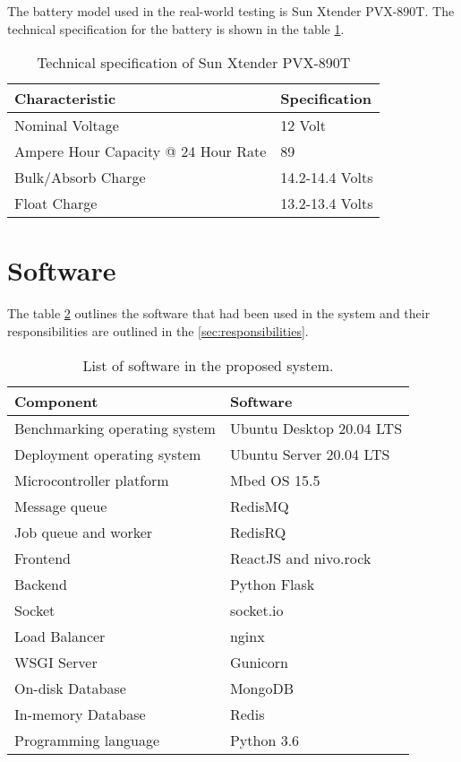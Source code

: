 \documentclass[../thesis.tex]{subfiles}
\begin{document}
The battery model used in the real-world testing is Sun Xtender PVX-890T. The technical specification for the battery is shown in the table \ref{tab:pvx890t}. 

\begin{table}[h!]
	\begin{center}
		\caption{Technical specification of Sun Xtender PVX-890T}
		\label{tab:pvx890t}
		\begin{tabular}{l|l}
			\toprule
			\textbf{Characteristic} & \textbf{Specification}\\
			\midrule
			Nominal Voltage & 12 Volt\\
			Ampere Hour Capacity @ 24 Hour Rate & 89\\
			Bulk/Absorb Charge & 14.2-14.4 Volts\\
			Float Charge & 13.2-13.4 Volts\\
			\bottomrule
		\end{tabular}
	\end{center}
\end{table}

\section{Software}

The table \ref{tab:softwareList} outlines the software that had been used in the system and their responsibilities are outlined in the \autoref{sec:responsibilities}. 

\begin{table}[h!]
	\begin{center}
		\caption{List of software in the proposed system.}
		\label{tab:softwareList}
		\begin{tabular}{l|l}
			\toprule
			\textbf{Component} & \textbf{Software}\\
			\midrule
			Benchmarking operating system & Ubuntu Desktop 20.04 LTS\\
			Deployment operating system & Ubuntu Server 20.04 LTS\\
			Microcontroller platform & Mbed OS 15.5\\
			Message queue & RedisMQ\\
			Job queue and worker & RedisRQ\\
			Frontend & ReactJS and nivo.rock\\
			Backend & Python Flask\\
			Socket & socket.io\\
			Load Balancer & nginx\\
			WSGI Server & Gunicorn\\
			On-disk Database & MongoDB\\
			In-memory Database & Redis\\
			Programming language & Python 3.6\\
			\bottomrule
		\end{tabular}
	\end{center}
\end{table}
\end{document}
